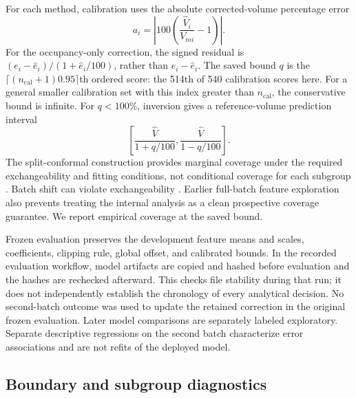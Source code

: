 \documentclass[journal]{IEEEtran}
\begin{document}
For each method, calibration uses the absolute corrected-volume percentage error
\begin{equation}
a_i=\left|100\left(\frac{\widehat V_i}{V_{mi}}-1\right)\right|.
\end{equation}
For the occupancy-only correction, the signed residual is $(e_i-\widehat e_i)/(1+\widehat e_i/100)$, rather than $e_i-\widehat e_i$. The saved bound $q$ is the $\lceil(n_{\mathrm{cal}}+1)0.95\rceil$th ordered score: the 514th of 540 calibration scores here. For a general smaller calibration set with this index greater than $n_{\mathrm{cal}}$, the conservative bound is infinite. For $q<100$\%, inversion gives a reference-volume prediction interval
\begin{equation}
\left[\frac{\widehat V}{1+q/100},\frac{\widehat V}{1-q/100}\right].
\end{equation}
The split-conformal construction \cite{ref19} provides marginal coverage under the required exchangeability and fitting conditions, not conditional coverage for each subgroup \cite{ref29}. Batch shift can violate exchangeability \cite{ref28}. Earlier full-batch feature exploration also prevents treating the internal analysis as a clean prospective coverage guarantee. We report empirical coverage at the saved bound.

Frozen evaluation preserves the development feature means and scales, coefficients, clipping rule, global offset, and calibrated bounds. In the recorded evaluation workflow, model artifacts are copied and hashed before evaluation and the hashes are rechecked afterward. This checks file stability during that run; it does not independently establish the chronology of every analytical decision. No second-batch outcome was used to update the retained correction in the original frozen evaluation. Later model comparisons are separately labeled exploratory. Separate descriptive regressions on the second batch characterize error associations and are not refits of the deployed model.

\subsection{Boundary and subgroup diagnostics}
\end{document}
